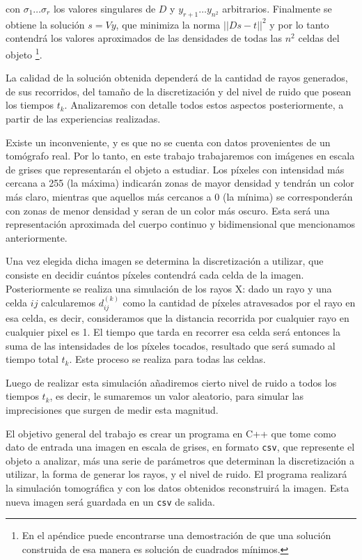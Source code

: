 \documentclass[a4paper]{article}
\begin{document}
\noindent con $\sigma_1 \ldots \sigma_r$ los valores singulares de $D$ y $y_{r+1} \ldots y_{n^2}$ arbitrarios. Finalmente se obtiene la solución 
$s = Vy$, que minimiza la norma $||Ds - t||^2$ y por lo tanto contendrá los valores aproximados de las densidades de todas las $n^2$ celdas del 
objeto \footnote{En el apéndice puede encontrarse una demostración de que una solución construida de esa manera es solución de cuadrados mínimos.}.

La calidad de la solución obtenida dependerá de la cantidad de rayos generados, de sus recorridos, del tamaño de la discretización y del nivel de 
ruido que posean los tiempos $t_k$. Analizaremos con detalle todos estos aspectos posteriormente, a partir de las experiencias realizadas.

Existe un inconveniente, y es que no se cuenta con datos provenientes de un tomógrafo real. Por lo tanto, en este trabajo trabajaremos con imágenes 
en escala de grises que representarán el objeto a estudiar. Los píxeles con intensidad más cercana a 255 (la máxima) indicarán zonas de mayor 
densidad y tendrán un color más claro, mientras que aquellos más cercanos a 0 (la mínima) se corresponderán con zonas de menor densidad y seran de 
un color más oscuro. Esta será una representación aproximada del cuerpo continuo y bidimensional que mencionamos anteriormente.

Una vez elegida dicha imagen se determina la discretización a utilizar, que consiste en decidir cuántos píxeles contendrá cada celda de la imagen.
Posteriormente se realiza una simulación de los rayos X: dado un rayo y una celda $ij$ calcularemos $d_{ij}^{(k)}$ como la cantidad de píxeles 
atravesados por el rayo en esa celda, es decir, consideramos que la distancia recorrida por cualquier rayo en cualquier pixel es 1. El tiempo que 
tarda en recorrer esa celda será entonces la suma de las intensidades de los píxeles tocados, resultado que será sumado al tiempo total $t_k$. Este 
proceso se realiza para todas las celdas.

Luego de realizar esta simulación añadiremos cierto nivel de ruido a todos los tiempos $t_k$, es decir, le sumaremos un valor aleatorio, para simular 
las imprecisiones que surgen de medir esta magnitud.

El objetivo general del trabajo es crear un programa en C++ que tome como dato de entrada una imagen en escala de grises, en formato \texttt{csv},
que represente el objeto a analizar, más una serie de parámetros que determinan la discretización a utilizar, la forma de generar los rayos, y 
el nivel de ruido. El programa realizará la simulación tomográfica y con los datos obtenidos reconstruirá la imagen. Esta nueva imagen será 
guardada en un \texttt{csv} de salida.
\end{document}
